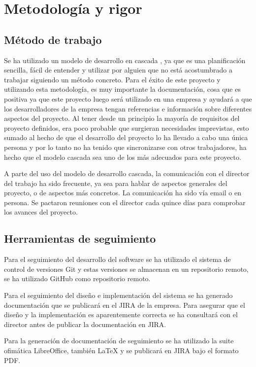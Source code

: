 \chapter{Metodología y rigor}
\section{Método de trabajo}
Se ha utilizado un modelo de desarrollo en cascada \cite{Tfg:waterfall}, ya que es una planificación sencilla, fácil de entender y utilizar por alguien que no está acostumbrado a trabajar siguiendo un método concreto. Para el éxito de este proyecto y utilizando esta metodología, es muy importante la documentación, cosa que es positiva ya que este proyecto luego será utilizado en una empresa y ayudará a que los desarrolladores de la empresa tengan referencias e información sobre diferentes aspectos del proyecto. Al tener desde un principio la mayoría de requisitos del proyecto definidos, era poco probable que surgieran necesidades imprevistas, esto sumado al hecho de que el desarrollo del proyecto lo ha llevado a cabo una única persona y por lo tanto no ha tenido que sincronizarse con otros trabajadores, ha hecho que el modelo cascada sea uno de los más adecuados para este proyecto.

A parte del uso del modelo de desarrollo cascada, la comunicación con el director del trabajo ha sido frecuente, ya sea para hablar de aspectos generales del proyecto, o de aspectos más concretos. La comunicación ha sido vía email o en persona. Se pactaron reuniones con el director cada quince días para comprobar los avances del proyecto. 

\section{Herramientas de seguimiento}
Para el seguimiento del desarrollo del software se ha utilizado el sistema de control de versiones Git y estas versiones se almacenan en un repositorio remoto, se ha utilizado GitHub como repositorio remoto.

Para el seguimiento del diseño e implementación del sistema se ha generado documentación que se publicará en el JIRA de la empresa. Para asegurar que el diseño y la implementación es aparentemente correcta se ha consultará con el director antes de publicar la documentación en JIRA.

Para la generación de documentación de seguimiento se ha utilizado la suite ofimática LibreOffice, también LaTeX y se publicará en JIRA bajo el formato PDF.

